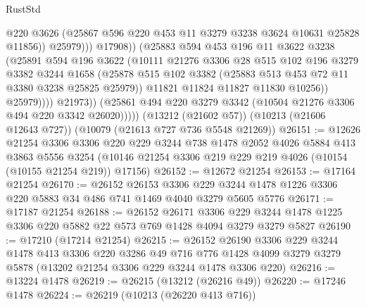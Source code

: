 \begin{lexlean}{RustStd}
\begin{coremodule}
                                @220
                                @3626
                                (@25867 @596 @220 @453 @11 @3279 @3238 @3624 @10631 @25828 @11856))
                              @25979)))
                        @17908))
                    (@25883
                      @594
                      @453
                      @196
                      @11
                      @3622
                      @3238
                      (@25891
                        @594
                        @196
                        @3622
                        (@10111
                          @21276
                          @3306
                          @28
                          @515
                          @102
                          @196
                          @3279
                          @3382
                          @3244
                          @1658
                          (@25878
                            @515
                            @102
                            @3382
                            (@25883 @513 @453 @72 @11 @3380 @3238 @25825 @25979))
                          @11821
                          @11824
                          @11827
                          @11830
                          @10256))
                      @25979))))
              @21973))
          (@25861 @494 @220 @3279 @3342 (@10504 @21276 @3306 @494 @220 @3342 @26020)))))
    (@13212 (@21602 @57))
    (@10213 (@21606 @12643 @727))
    (@10079 (@21613 @727 @736 @5548 @21269))
@26151 := @12626
    @21254
    @3306
    @3306
    @220
    @229
    @3244
    @738
    @1478
    @2052
    @4026
    @5884
    @413
    @3863
    @5556
    @3254
    (@10146 @21254 @3306 @219 @229 @219 @4026 (@10154 (@10155 @21254 @219)) @17156)
@26152 := @12672 @21254
@26153 := @17164 @21254
@26170 := @26152
    @26153
    @3306
    @229
    @3244
    @1478
    @1226
    @3306
    @220
    @5883
    @34
    @486
    @741
    @1469
    @4040
    @3279
    @5605
    @5776
@26171 := @17187 @21254
@26188 := @26152
    @26171
    @3306
    @229
    @3244
    @1478
    @1225
    @3306
    @220
    @5882
    @22
    @573
    @769
    @1428
    @4094
    @3279
    @3279
    @5827
@26190 := @17210 (@17214 @21254)
@26215 := @26152
    @26190
    @3306
    @229
    @3244
    @1478
    @413
    @3306
    @220
    @3286
    @49
    @716
    @776
    @1428
    @4099
    @3279
    @3279
    @5878
    (@13202 @21254 @3306 @229 @3244 @1478 @3306 @220)
@26216 := @13224 @1478
@26219 := @26215 (@13212 (@26216 @49))
@26220 := @17246 @1478
@26224 := @26219 (@10213 (@26220 @413 @716))

\end{coremodule}
\end{lexlean}
